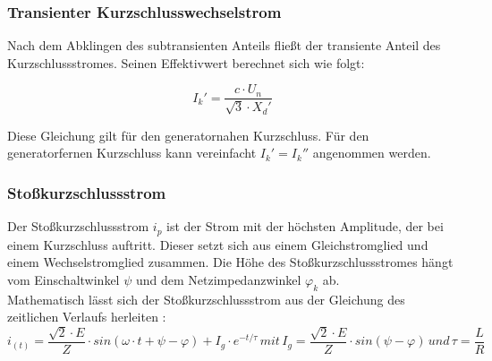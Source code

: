 \documentclass{scrartcl}
\begin{document}
\begin{onehalfspace}
\subsubsection{Transienter Kurzschlusswechselstrom}
Nach dem Abklingen des subtransienten Anteils fließt der transiente Anteil des Kurzschlussstromes. Seinen Effektivwert berechnet sich wie folgt:

\begin{equation}
I_k' = \frac{ c \cdot U_n}{\sqrt{3} \cdot X_d'}
\end{equation}

Diese Gleichung gilt für den generatornahen Kurzschluss. Für den generatorfernen Kurzschluss kann vereinfacht $I_k' = I_k''$ angenommen werden.

\subsubsection{Stoßkurzschlussstrom}
Der Stoßkurzschlussstrom $i_p$ ist der Strom mit der höchsten Amplitude, der bei einem Kurzschluss auftritt. Dieser setzt sich aus einem Gleichstromglied und einem Wechselstromglied zusammen. Die Höhe des Stoßkurzschlussstromes hängt vom Einschaltwinkel $\psi$ und dem Netzimpedanzwinkel $\varphi_k$ ab. \\
Mathematisch lässt sich der Stoßkurzschlussstrom aus der Gleichung des zeitlichen Verlaufs herleiten \cite[S. 20]{Roeper1964}: \\

\begin{equation}
i_{(t)} = \frac{\sqrt{2} \cdot E}{Z} \cdot sin(\omega \cdot t + \psi - \varphi) + I_g \cdot e^{-t/\tau} 
\hspace{2pt} mit \hspace{2pt} I_g = \frac{\sqrt{2} \cdot E}{Z} \cdot sin( \psi -  \varphi) \hspace{2pt} und \hspace{2pt} \tau = \frac{L}{R}
\end{equation}


\end{onehalfspace}
\end{document}
